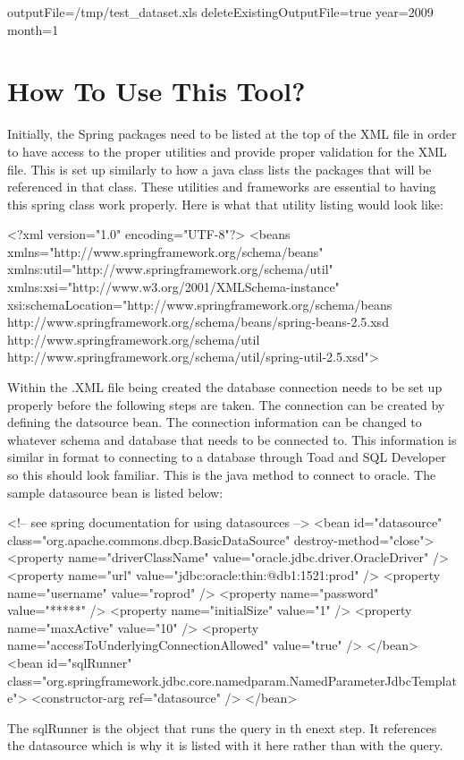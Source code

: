 \documentclass[letterpaper,10pt]{article}
\begin{document}
\begin{verbatimtab}
 outputFile=/tmp/test_dataset.xls
 deleteExistingOutputFile=true
 year=2009
 month=1
\end{verbatimtab}

\section{How To Use This Tool?}
Initially, the Spring packages need to be listed at the top of the XML file in order to have access to the proper utilities and provide proper validation for the XML file.  This is set up similarly to how a java class lists the packages that will be referenced in that class.  These utilities and frameworks are essential to having this spring class work properly.  Here is what that utility listing would look like:
\begin{verbatimtab}
 <?xml version="1.0" encoding="UTF-8"?>
<beans xmlns="http://www.springframework.org/schema/beans"
	xmlns:util="http://www.springframework.org/schema/util" xmlns:xsi="http://www.w3.org/2001/XMLSchema-instance"
	xsi:schemaLocation="http://www.springframework.org/schema/beans
           http://www.springframework.org/schema/beans/spring-beans-2.5.xsd
           http://www.springframework.org/schema/util
           http://www.springframework.org/schema/util/spring-util-2.5.xsd">
\end{verbatimtab}

Within the .XML file being created the database connection needs to be set up properly before the following steps are taken.  The connection can be created by defining the datsource bean.  The connection information can be changed to whatever schema and database that needs to be connected to.  This information is similar in format to connecting to a database through Toad and SQL Developer so this should look familiar.  This is the java method to connect to oracle.  The sample datasource bean is listed below: 
\begin{verbatimtab}
	<!--
		see spring documentation for using datasources
	-->
	<bean id="datasource" class="org.apache.commons.dbcp.BasicDataSource"
		destroy-method="close">
		<property name="driverClassName" value="oracle.jdbc.driver.OracleDriver" />
		<property name="url" value="jdbc:oracle:thin:@db1:1521:prod" />
		<property name="username" value="roprod" />
		<property name="password" value="*****" />
		<property name="initialSize" value="1" />
		<property name="maxActive" value="10" />
		<property name="accessToUnderlyingConnectionAllowed" value="true" />
	</bean>
	<bean id="sqlRunner"
		class="org.springframework.jdbc.core.namedparam.NamedParameterJdbcTemplate">
		<constructor-arg ref="datasource" />
	</bean>
\end{verbatimtab}
The sqlRunner is the object that runs the query in th enext step.  It references the datasource which is why it is listed with it here rather than with the query.
\end{document}

